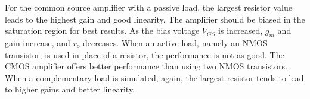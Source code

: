 For the common source amplifier with a passive load, the largest resistor value leads to the highest gain and good linearity. The amplifier should be biased in the saturation region for best results. As the bias voltage $V_{GS}$ is increased, $g_m$ and gain increase, and $r_o$ decreases. When an active load, namely an NMOS transistor, is used in place of a resistor, the performance is not as good. The CMOS amplifier offers better performance than using two NMOS transistors. When a complementary load is simulated, again, the largest resistor tends to lead to higher gains and better linearity.
